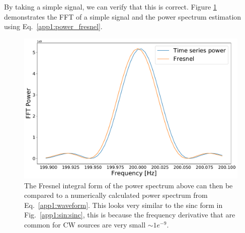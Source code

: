 By taking a simple signal, we can verify that this is correct. Figure \ref{app1:sinderivative:fresnel} demonstrates the \gls{FFT} of a simple signal and the power spectrum estimation using Eq.~\ref{app1:power_fresnel}.

\begin{figure}
	\centering
	\includegraphics[width=0.9\linewidth]{AppendixA/fresnel_fft.pdf}
	\caption[Comparison of power spectrum simulation with \gls{FFT} of sinusoid with frequency derivative.]{The Fresnel integral form of the power spectrum above can then be compared to a numerically calculated power spectrum from Eq.~\ref{app1:waveform}. This looks very similar to the sinc form in Fig.~\ref{app1:sin:sinc}, this is because the frequency derivative that are common for \gls{CW} sources are very small $\sim 1e^{-9} $.  }
	\label{app1:sinderivative:fresnel}
\end{figure}

